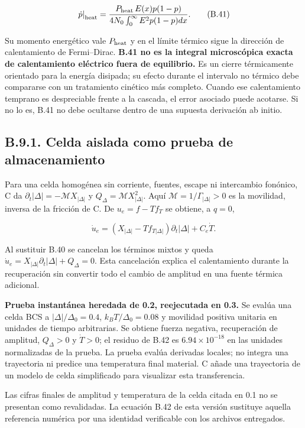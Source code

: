 \documentclass[
  spanish,
  10pt,
  a4paper,
]{article}
\begin{document}
\[
\left.\dot p\right|_{\rm heat}
=\frac{P_{\rm heat}\,E(x)p(1-p)}
{4N_0\int_0^\infty E^2p(1-p)dx}. \tag{B.41}
\]

Su momento energético vale \(P_{\rm heat}\) y en el límite térmico sigue
la dirección de calentamiento de Fermi--Dirac. \textbf{B.41 no es la
integral microscópica exacta de calentamiento eléctrico fuera de
equilibrio.} Es un cierre térmicamente orientado para la energía
disipada; su efecto durante el intervalo no térmico debe compararse con
un tratamiento cinético más completo. Cuando ese calentamiento temprano
es despreciable frente a la cascada, el error asociado puede acotarse.
Si no lo es, B.41 no debe ocultarse dentro de una supuesta derivación ab
initio.

\subsection{B.9.1. Celda aislada como prueba de
almacenamiento}\label{b.9.1.-celda-aislada-como-prueba-de-almacenamiento}

Para una celda homogénea sin corriente, fuentes, escape ni intercambio
fonónico, C da \(\partial_t|\Delta|=-\mathcal M X_{|\Delta|}\) y
\(Q_\Delta=\mathcal M X_{|\Delta|}^2\). Aquí
\(\mathcal M=1/\Gamma_{|\Delta|}>0\) es la movilidad, inversa de la
fricción de C. De \(u_e=f-Tf_T\) se obtiene, a \(q=0\),

\[
\dot u_e=(X_{|\Delta|}-T f_{T|\Delta|})\partial_t|\Delta|
+C_e\dot T.
\tag{B.42}
\]

Al sustituir B.40 se cancelan los términos mixtos y queda
\(\dot u_e=X_{|\Delta|}\partial_t|\Delta|+Q_\Delta=0\). Esta cancelación
explica el calentamiento durante la recuperación sin convertir todo el
cambio de amplitud en una fuente térmica adicional.

\textbf{Prueba instantánea heredada de 0.2, reejecutada en 0.3.} Se
evalúa una celda BCS a \(|\Delta|/\Delta_0=0.4\), \(k_BT/\Delta_0=0.08\)
y movilidad positiva unitaria en unidades de tiempo arbitrarias. Se
obtiene fuerza negativa, recuperación de amplitud, \(Q_\Delta>0\) y
\(\dot T>0\); el residuo de B.42 es \(6.94\times10^{-18}\) en las
unidades normalizadas de la prueba. La prueba evalúa derivadas locales;
no integra una trayectoria ni predice una temperatura final material. C
añade una trayectoria de un modelo de celda simplificado para visualizar
esta transferencia.

Las cifras finales de amplitud y temperatura de la celda citada en 0.1
no se presentan como revalidadas. La ecuación B.42 de esta versión
sustituye aquella referencia numérica por una identidad verificable con
los archivos entregados.
\end{document}
